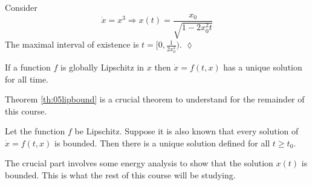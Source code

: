 \begin{example}
Consider
$$\dot{x} = x^3 \Rightarrow x(t) = \frac{x_0}{\sqrt{1-2x_0^2t}}$$
The maximal interval of existence is $t=[0,\frac{1}{2x_0^2})$.
$\lozenge$
\end{example}

\begin{theorem}
If a function $f$ is globally Lipschitz in $x$ then $\dot{x}=f(t,x)$ has a unique solution for all time.
\end{theorem}

Theorem \ref{th:05lipbound} is a crucial theorem to understand for the remainder of this course.
\begin{theorem}
\label{th:05lipbound}
Let the function $f$ be Lipschitz. Suppose it is also known that every solution of $\dot{x}=f(t,x)$ is bounded. Then there is a unique solution defined for all $t\geq t_0$.
\end{theorem}

The crucial part involves some energy analysis to show that the solution $x(t)$ is bounded. This is what the rest of this course will be studying.
